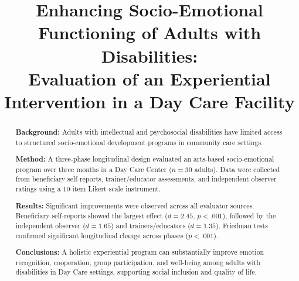 \documentclass[12pt,a4paper]{article}
\title{Enhancing Socio-Emotional Functioning of Adults with Disabilities:\\
Evaluation of an Experiential Intervention in a Day Care Facility}
\date{}
\begin{document}
\maketitle

\begin{abstract}
\noindent\textbf{Background:} Adults with intellectual and psychosocial disabilities have limited access to structured socio-emotional development programs in community care settings.

\noindent\textbf{Method:} A three-phase longitudinal design evaluated an arts-based socio-emotional program over three months in a Day Care Center ($n = 30$ adults). Data were collected from beneficiary self-reports, trainer/educator assessments, and independent observer ratings using a 10-item Likert-scale instrument.

\noindent\textbf{Results:} Significant improvements were observed across all evaluator sources. Beneficiary self-reports showed the largest effect ($d = 2.45$, $p < .001$), followed by the independent observer ($d = 1.65$) and trainers/educators ($d = 1.35$). Friedman tests confirmed significant longitudinal change across phases ($p < .001$).

\noindent\textbf{Conclusions:} A holistic experiential program can substantially improve emotion recognition, cooperation, group participation, and well-being among adults with disabilities in Day Care settings, supporting social inclusion and quality of life.
\end{abstract}

\end{document}

